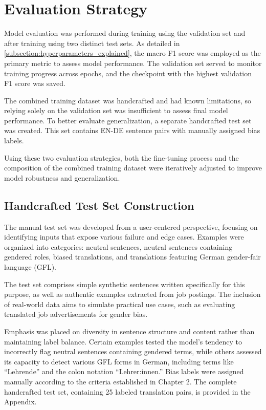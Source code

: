 \section{Evaluation Strategy}
    Model evaluation was performed during training using the validation set and after training using two distinct test sets. As detailed in \autoref{subsection:hyperparameters_explained}, the macro F1 score was employed as the primary metric to assess model performance. The validation set served to monitor training progress across epochs, and the checkpoint with the highest validation F1 score was saved.

    The combined training dataset was handcrafted and had known limitations, so relying solely on the validation set was insufficient to assess final model performance. To better evaluate generalization, a separate handcrafted test set was created. This set contains EN-DE sentence pairs with manually assigned bias labels.

    Using these two evaluation strategies, both the fine-tuning process and the composition of the combined training dataset were iteratively adjusted to improve model robustness and generalization.

\subsection{Handcrafted Test Set Construction} \label{subsection:eval_dataset}
    The manual test set was developed from a user-centered perspective, focusing on identifying inputs that expose various failure and edge cases. Examples were organized into categories: neutral sentences, neutral sentences containing gendered roles, biased translations, and translations featuring German gender-fair language (GFL). 

    The test set comprises simple synthetic sentences written specifically for this purpose, as well as authentic examples extracted from job postings. The inclusion of real-world data aims to simulate practical use cases, such as evaluating translated job advertisements for gender bias.

    Emphasis was placed on diversity in sentence structure and content rather than maintaining label balance. Certain examples tested the model’s tendency to incorrectly flag neutral sentences containing gendered terms, while others assessed its capacity to detect various GFL forms in German, including terms like “Lehrende” and the colon notation “Lehrer:innen.” Bias labels were assigned manually according to the criteria established in Chapter 2. The complete handcrafted test set, containing 25 labeled translation pairs, is provided in the Appendix.


